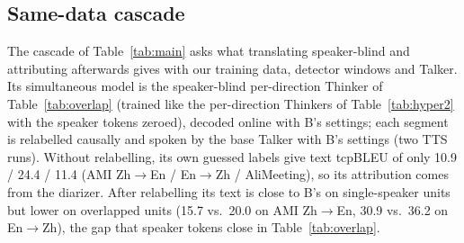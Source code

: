 \ifCascade
\subsection{Same-data cascade}
\label{app:cascade}
The cascade of Table~\ref{tab:main} asks what translating speaker-blind and attributing afterwards gives with our
training data, detector windows and Talker. Its simultaneous model is the speaker-blind per-direction Thinker of
Table~\ref{tab:overlap} (trained like the per-direction Thinkers of Table~\ref{tab:hyper2} with the speaker tokens
zeroed), decoded online with B's settings; each segment is relabelled causally and spoken by the base Talker with B's
settings (two TTS runs). Without relabelling, its own guessed labels give text tcpBLEU of only 10.9 / 24.4 / 11.4 (AMI
Zh$\rightarrow$En / En$\rightarrow$Zh / AliMeeting), so its attribution comes from the diarizer. After relabelling its
text is close to B's on single-speaker units but lower on overlapped units (15.7 vs.\ 20.0 on AMI Zh$\rightarrow$En,
30.9 vs.\ 36.2 on En$\rightarrow$Zh), the gap that speaker tokens close in Table~\ref{tab:overlap}.
\fi

